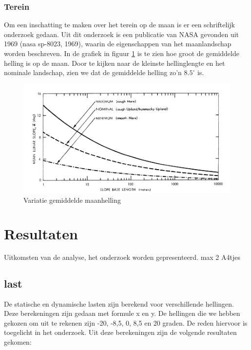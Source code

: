 \documentclass{article}
\begin{document}
            \subsubsection*{Terein}
                Om een inschatting te maken over het terein op de maan is er een schriftelijk onderzoek gedaan.
                Uit dit onderzoek is een publicatie van NASA gevonden uit 1969 (nasa sp-8023, 1969), waarin de eigenschappen van het maanlandschap worden beschreven.
                In de grafiek in figuur \ref{fig:maanhelling} is te zien hoe groot de gemiddelde helling is op de maan.
                Door te kijken naar de kleinste hellinglengte en het nominale landschap, zien we dat de gemiddelde helling zo'n $8.5^\circ$ is.

                \begin{figure}[h]
                    \includegraphics[width=\textwidth]{variation_of_mean_lunar_slope}
                    \caption{Variatie gemiddelde maanhelling}
                    \label{fig:maanhelling}
                    \centering
                \end{figure}
                
    \pagebreak
    \section{Resultaten}
        Uitkomsten van de analyse, het onderzoek worden gepresenteerd. max 2 A4tjes

    \subsection{last}
    De statische en dynamische lasten zijn berekend voor verschillende hellingen. 
    Deze berekeningen zijn gedaan met formule x en y.
    De hellingen die we hebben gekozen om uit te rekenen zijn -20, -8,5, 0, 8,5 en 20 graden.
    De reden hiervoor is toegelicht in het onderzoek.
    Uit deze berekeningen zijn de volgende resultaten gekomen: 
\end{document}

